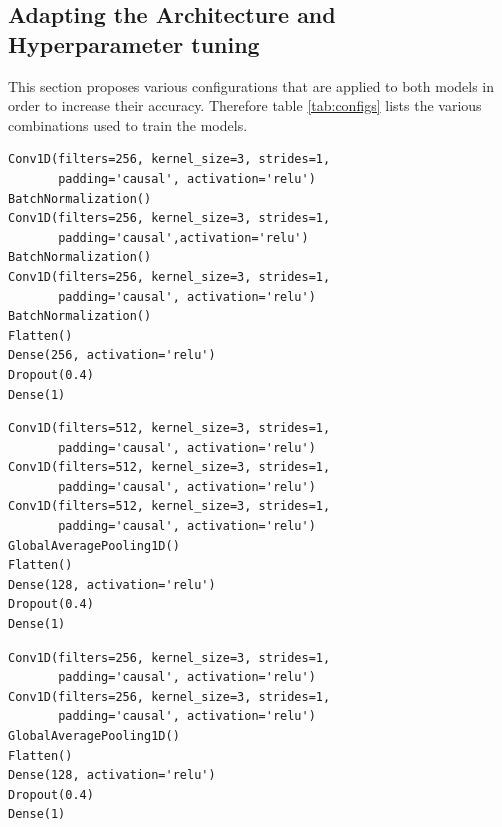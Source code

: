 \subsection{Adapting the Architecture and Hyperparameter tuning}
\label{sec:hyper}
This section proposes various configurations that are applied to both models in order to increase their accuracy. Therefore table \ref{tab:configs} lists the various combinations used to train the models.

\newsavebox{\codebox} %
\newsavebox{\codeboxtwo} %
\newsavebox{\codeboxthree} %
\newsavebox{\codeboxfour} %
\newsavebox{\codeboxfive} %

\newsavebox{\codeboxsix} %

\begin{lrbox}{\codeboxsix} %
\begin{lstlisting}[numbers=none, basicstyle=\tiny, numbersep=0pt, xleftmargin=0pt, xrightmargin=0pt, backgroundcolor=\color{white}]
Conv1D(filters=256, kernel_size=3, strides=1, 
	   padding='causal', activation='relu')
BatchNormalization()
Conv1D(filters=256, kernel_size=3, strides=1,
	   padding='causal',activation='relu')
BatchNormalization()
Conv1D(filters=256, kernel_size=3, strides=1, 
	   padding='causal', activation='relu')
BatchNormalization()
Flatten()
Dense(256, activation='relu')
Dropout(0.4)
Dense(1)
\end{lstlisting}
\end{lrbox} %



\begin{lrbox}{\codeboxfive} %
\begin{lstlisting}[numbers=none, basicstyle=\tiny, numbersep=0pt, xleftmargin=0pt, xrightmargin=0pt, backgroundcolor=\color{white}]
Conv1D(filters=512, kernel_size=3, strides=1,
       padding='causal', activation='relu')
Conv1D(filters=512, kernel_size=3, strides=1,
       padding='causal', activation='relu')
Conv1D(filters=512, kernel_size=3, strides=1,
       padding='causal', activation='relu')
GlobalAveragePooling1D()
Flatten()
Dense(128, activation='relu')
Dropout(0.4)
Dense(1)
\end{lstlisting}
\end{lrbox} %


\begin{lrbox}{\codeboxfour} %
\begin{lstlisting}[numbers=none, basicstyle=\tiny, numbersep=0pt, xleftmargin=0pt, xrightmargin=0pt, backgroundcolor=\color{white}]
Conv1D(filters=256, kernel_size=3, strides=1,
       padding='causal', activation='relu')
Conv1D(filters=256, kernel_size=3, strides=1,
       padding='causal', activation='relu')
GlobalAveragePooling1D()
Flatten()
Dense(128, activation='relu')
Dropout(0.4)
Dense(1)
\end{lstlisting}
\end{lrbox} %


